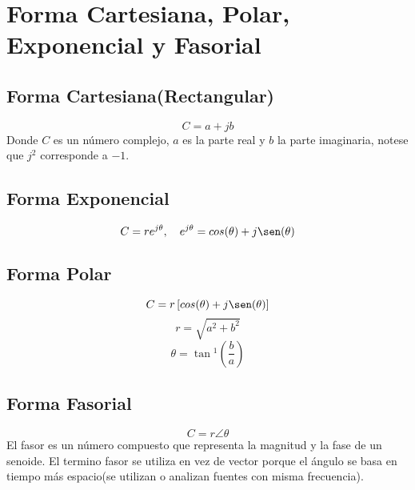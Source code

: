 \chapter{Forma Cartesiana, Polar, Exponencial y Fasorial}
\begin{multicols}{2}
  \section*{Forma Cartesiana\small{(Rectangular)}}
  \begin{equation*}
    C = a + j b
  \end{equation*}
  Donde $C$ es un número complejo, $a$ es la parte real y $b$ la parte imaginaria,
  notese que $j^2$ corresponde a $-1$.

  \columnbreak

  \section*{Forma Exponencial}
  \begin{equation*}
    C = r e^{j\theta},\quad e^{j\theta} = cos(\theta) + j\sen(\theta)
  \end{equation*}
\end{multicols}

\begin{multicols}{2}
  \section*{Forma Polar}
  \begin{equation*}
    C = r\left[cos(\theta) + j\sen(\theta)\right]
  \end{equation*}
  \begin{equation*}
    r = \sqrt{a^2 + b^2}
  \end{equation*}
  \begin{equation*}
    \theta = \tan{^1}\left(\frac{b}{a}\right)
  \end{equation*}

  \columnbreak

  \section*{Forma Fasorial}
  \begin{equation*}
    C = r \angle \theta
  \end{equation*}
  El fasor es un número compuesto que representa la magnitud y la
  fase de un senoide. El termino fasor se utiliza en vez de vector porque el
  ángulo se basa en tiempo más espacio(se utilizan o analizan fuentes con misma
  frecuencia).
\end{multicols}

